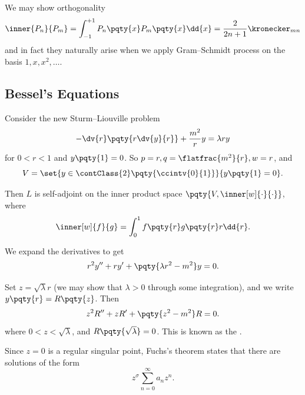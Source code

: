 We may show orthogonality
\begin{equation}
    \inner{P_n}{P_m} = \int_{-1}^{+1} P_n\pqty{x} P_m\pqty{x} \dd{x} = \frac{2}{2n + 1} \kronecker_{m n}
\end{equation}
and in fact they naturally arise when we apply Gram--Schmidt process on the basis \(1, x, x^2, \ldots\).

\subsection{Bessel's Equations}

Consider the new Sturm--Liouville problem
\begin{equation}
    - \dv{r} \pqty{r \dv{y}{r}} + \frac{m^2}{r} y = \lambda r y
\end{equation}
for \(0 < r < 1\) and \(y \pqty{1} = 0\). So \(p = r, q = \flatfrac{m^2}{r}, w = r\), and
\begin{equation}
    V = \set{y \in \contClass{2} \pqty{\ccintv{0}{1}}}{y\pqty{1} = 0}.
\end{equation}

Then \(L\) is self-adjoint on the inner product space \(\pqty{V, \inner[w]{\cdot}{\cdot}}\), where
\begin{equation}
    \inner[w]{f}{g} = \int_{0}^{1} f\pqty{r} g\pqty{r} r \dd{r}.
\end{equation}

We expand the derivatives to get
\begin{equation}
    r^2 y'' + r y' + \pqty{\lambda r^2 - m^2} y = 0.
\end{equation}

Set \(z = \sqrt{\lambda} r\) (we may show that \(\lambda > 0\) through some integration), and we write \(y \pqty{r} = R \pqty{z}\). Then
\begin{equation}
    z^2 R'' + z R' + \pqty{z^2 - m^2} R = 0.
\end{equation}
where \(0 < z < \sqrt{\lambda}\), and \(R \pqty{\sqrt{\lambda}} = 0\). This is known as the .

Since \(z = 0\) is a regular singular point, Fuchs's theorem states that there are solutions of the form
\begin{equation}
    z^{\sigma} \sum_{n = 0}^{\infty} a_n z^n.
\end{equation}

